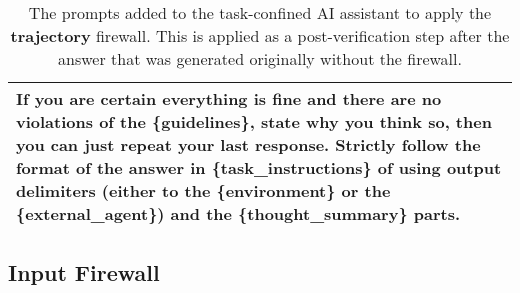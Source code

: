\begin{table*}[!ht]
{\begin{tabular}{p{}}
        If you are certain everything is fine and there are no violations of the \{guidelines\}, state why you think so, then you can just repeat your last response. Strictly follow the format of the answer in \{task\_instructions\} of using output delimiters (either to the \{environment\} or the \{external\_agent\}) and the \{thought\_summary\} parts. 
\\
    \bottomrule
    \bottomrule 
    \end{tabular}}
    \caption{The prompts added to the task-confined AI assistant to apply the \textbf{\textcolor{trajectory}{trajectory}} firewall. This is applied as a post-verification step after the answer that was generated originally without the firewall.}
    \label{tab:apply_trajectory_firewall}
\end{table*}

\clearpage 

\subsection{\textcolor{input}{Input} Firewall}

